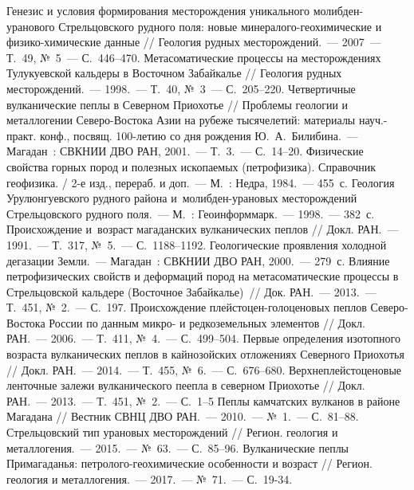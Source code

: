 \begin{thebibliography}{99}
\bibitem{} Генезис и условия формирования месторождения уникального молибден-уранового Стрельцовского рудного поля: новые минералого-геохимические и физико-химические данные // Геология рудных месторождений.~--- 2007~--- Т.~49, №~5~--- С.~446--470.
\bibitem{} Метасоматические процессы на месторождениях Тулукуевской кальдеры в Восточном Забайкалье // Геология рудных месторождений.~--- 1998.~--- Т.~40, №~3~--- С.~205--220.
\bibitem{} Четвертичные вулканические пеплы в Северном Приохотье // Проблемы геологии и металлогении Северо-Востока Азии на рубеже тысячелетий: материалы науч.-практ. конф., посвящ. 100-летию со дня рождения Ю.~А.~Билибина.~--- Магадан~: СВКНИИ ДВО РАН, 2001.~--- Т.~3.~--- С.~14--20.
\bibitem{} Физические свойства горных пород и полезных ископаемых (петрофизика). Справочник геофизика. / 2-е изд., перераб. и доп.~--- М.~: Недра, 1984.~--- 455~с.
\bibitem{} Геология Урулюнгуевского рудного района и~молибден-урановых месторождений Стрельцовского рудного поля.~--- М.~: Геоинформмарк.~--- 1998.~--- 382~с.
\bibitem{} Происхождение и~возраст магаданских вулканических пеплов // Докл. РАН.~--- 1991.~--- Т.~317, №~5.~--- С.~1188--1192.
\bibitem{} Геологические проявления холодной дегазации Земли.~--- Магадан~: СВКНИИ ДВО РАН, 2000.~--- 279~с.
\bibitem{} Влияние петрофизических свойств и деформаций пород на метасоматические процессы в Стрельцовской кальдере (Восточное Забайкалье)~// Док. РАН.~---  2013.~--- Т.~451, №~2.~--- С.~197.
\bibitem{} Происхождение плейстоцен-голоценовых пеплов Северо-Востока России по данным микро- и редкоземельных элементов // Докл. РАН.~--- 2006.~--- Т.~411, №~4.~--- С.~499--504.
\bibitem{} Первые определения изотопного возраста вулканических пеплов в кайнозойских отложениях Северного Приохотья // Докл. РАН.~--- 2014.~--- Т.~455, №~6.~--- С.~676--680.
\bibitem{} Верхнеплейстоценовые ленточные залежи вулканического пеепла в северном Приохотье // Докл. РАН.~--- 2013.~--- Т.~451, №~2.~--- С.~1--5
\bibitem{} Пеплы камчатских вулканов в районе Магадана // Вестник СВНЦ ДВО РАН.~--- 2010.~--- №~1.~--- С.~81--88.
\bibitem{} Стрельцовский тип урановых месторождений // Регион. геология и металлогения.~--- 2015.~--- №~63.~--- С.~85--96.
\bibitem{} Вулканические пеплы Примагаданья: петролого-геохимические особенности и возраст // Регион. геология и металлогения.~--- 2017.~--- №~71.~--- С.~19-34.

\end{thebibliography}
